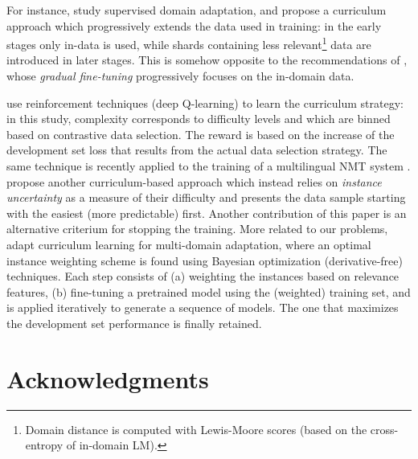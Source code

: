 \documentclass[11pt]{article}
\newcommand{\fyTodo}[1]{\Todo[FY:]{\textcolor{orange}{#1}}}
\begin{document}
For instance, \citet{Zhang19curriculum} study supervised domain adaptation, and propose a curriculum approach which progressively extends the data used in training: in the early stages only in-data is used, while shards containing less relevant\footnote{Domain distance is computed with Lewis-Moore scores (based on the cross-entropy of in-domain LM).} data are introduced in later stages. This is somehow opposite to the recommendations of \citet{Vanderwees17dynamic}, whose \emph{gradual fine-tuning} progressively focuses on the in-domain data.\fyTodo{These have not been compared? and also to what we do ?} 

\citet{Kumar19reinforcement} use reinforcement techniques (deep Q-learning) to learn the curriculum strategy: in this study, complexity corresponds to difficulty levels and which are binned based on contrastive data selection. The reward is based on the increase of the development set loss that results from the actual data selection strategy.\fyTodo{Alert: what do we do during warm-up ?} The same technique is recently applied to the training of a multilingual NMT system \citep{Kumar21learning}. \citet{Zhou20uncertainty} propose another curriculum-based approach which instead relies on \emph{instance uncertainty} as a measure of their difficulty and presents the data sample starting with the easiest (more predictable) first. Another contribution of this paper is an alternative criterium for stopping the training. More related to our problems, \citet{Wang20learning-multi} adapt curriculum learning for multi-domain adaptation, where an optimal instance weighting scheme is found using Bayesian optimization (derivative-free) techniques. Each step consists of (a) weighting the instances based on relevance features, (b) fine-tuning a pretrained model using the (weighted) training set, and is applied iteratively to generate a sequence of models. The one that maximizes the development set performance is finally retained.

\section*{Acknowledgments}


\end{document}
